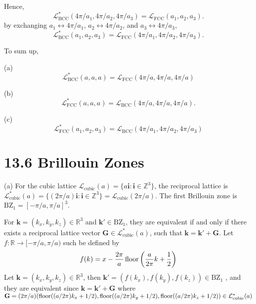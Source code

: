 \documentclass[a4paper,11pt]{article}
\begin{document}
Hence,
\begin{equation}
    \mathcal L_{\mathrm{BCC}}^*(4\pi/a_1, 4\pi/a_2, 4\pi/a_3)=\mathcal L_{\mathrm{FCC}}(a_1, a_2, a_3).
\end{equation}
by exchanging $a_1\leftrightarrow 4\pi/a_1$, $a_2\leftrightarrow 4\pi/a_2$, and $a_3\leftrightarrow 4\pi/a_3$,
\begin{equation}
    \mathcal L_{\mathrm{BCC}}^*(a_1, a_2, a_3)=\mathcal L_{\mathrm{FCC}}(4\pi/a_1, 4\pi/a_2, 4\pi/a_3).
\end{equation}

To sum up,

(a)
\begin{equation}
    \mathcal L_{\mathrm{BCC}}^*(a, a, a)=\mathcal L_{\mathrm{FCC}}(4\pi/a, 4\pi/a, 4\pi/a)
\end{equation}

(b)
\begin{equation}
    \mathcal L_{\mathrm{FCC}}^*(a, a, a)=\mathcal L_{\mathrm{BCC}}(4\pi/a, 4\pi/a, 4\pi/a).
\end{equation}

(c)\\
\begin{equation}
    \mathcal L_{\mathrm{FCC}}^*(a_1, a_2, a_3)=\mathcal L_{\mathrm{BCC}}(4\pi/a_1, 4\pi/a_2, 4\pi/a_3)
\end{equation}




\section{13.6 Brillouin Zones}

(a) For the cubic lattice $\mathcal L_{\text{cubic}}(a)=\{a\mathbf i:\mathbf i\in\mathbb Z^3\}$, the reciprocal lattice is $\mathcal L_{\text{cubic}}^*(a)=\{(2\pi/a)\mathbf i:\mathbf i\in\mathbb Z^3\}=\mathcal L_{\text{cubic}}(2\pi /a)$. The first Brillouin zone is $\mathrm{BZ}_1=[-\pi/a, \pi/a]^3$. 

For $\mathbf k=(k_x, k_y, k_z)\in\mathbb R^3$ and $\mathbf k'\in\mathrm{BZ}_1$,  they are equivalent if and only if there exists a reciprocal lattice vector $\mathbf G\in\mathcal L_{\text{cubic}}^*(a)$, such that $\mathbf k=\mathbf k'+ \mathbf G$. Let $f:\mathbb R\rightarrow [-\pi/a, \pi/a)$ such be defined by
\begin{equation}
    f(k)=x-\frac{2\pi}{a}\operatorname{floor}\left(\frac{a}{2\pi}k + \frac{1}{2}\right)
\end{equation}
Let $\mathbf k=(k_x, k_y, k_z)\in\mathbb R^3$, then $\mathbf k'=(f(k_x), f(k_y), f(k_z))\in\mathrm{BZ}_1$ , and they are equivalent since $\mathbf k=\mathbf k'+\mathbf G$ where $\mathbf G=(2\pi/a)(\operatorname{floor}((a/2\pi) k_x + 1/2), \operatorname{floor}((a/2\pi) k_y + 1/2), \operatorname{floor}((a/2\pi) k_z + 1/2))\in \mathcal L_{\text{cubic}}^*(a)$
\end{document}
